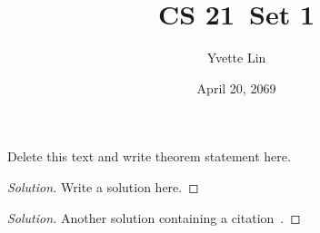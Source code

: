 \documentclass[11pt]{article}
\newcommand{\class}{CS 21}
\newcommand{\set}{Set 1}
\newcommand{\student}{Yvette Lin}
\newcommand{\duedate}{April 20, 2069}
\newenvironment{problem}[2][Problem]{\begin{trivlist} \item[\hskip \labelsep {\bfseries #1}\hskip \labelsep {\bfseries #2.}]}{\end{trivlist}}
\newenvironment{solution}{\begin{proof}[Solution]}{\end{proof}}
\newcommand{\prob}[1]{\begin{problem}{#1}\end{problem}}
\begin{document}
 
\title{\class \ \set}
\author{\student}
\date{\duedate}
\maketitle
\thispagestyle{titlepagestyle}
 
\begin{problem}{1.1}
    Delete this text and write theorem statement here.
\end{problem}

\begin{solution}
    Write a solution here.
\end{solution}

\prob{1.2}

\begin{solution}
    Another solution containing a citation~\cite{chael2016high}.
\end{solution}



\end{document}
